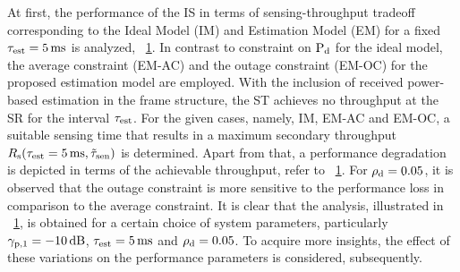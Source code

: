 {\begin{figure}[!ht]
{
}
\caption{}
\label{fig_IS:ST_gen}
\vspace{-0.0cm}
\end{figure}

At first, the performance of the IS in terms of sensing-throughput tradeoff corresponding to the Ideal Model (IM) and Estimation Model (EM) for a fixed $\tau_{\text{est}} = \SI{5}{ms}$ is analyzed,  \figurename~\ref{fig_IS:ST_gen}. In contrast to constraint on $\text{P}_{\text{d}}$ for the ideal model, the average constraint (EM-AC) and the outage constraint (EM-OC) for the proposed estimation model are employed. With the inclusion of received power-based estimation in the frame structure, the ST achieves no throughput at the SR for the interval $\tau_{\text{est}}$. For the given cases, namely, IM, EM-AC and EM-OC, a suitable sensing time that results in a maximum secondary throughput $R_{\text{s}}(\tau_{\text{est}} = \SI{5}{ms},\tilde{\tau}_{\text{sen}})$ is determined. Apart from that, a performance degradation is depicted in terms of the achievable throughput, refer to \figurename~\ref{fig_IS:ST_gen}. For $\rho_{\text{d}} = 0.05$, it is observed that the outage constraint is more sensitive to the performance loss in comparison to the average constraint. It is clear that the analysis, illustrated in \figurename~\ref{fig_IS:ST_gen}, is obtained for a certain choice of system parameters, particularly ${\gamma}_{\text{p,1}} = -\SI{10}{dB}$, $\tau_{\text{est}} = \SI{5}{ms}$ and $\rho_{\text{d}} = 0.05$. To acquire more insights, the effect of these variations on the performance parameters is considered, subsequently.


\begin{figure}[!ht]


\end{figure}}
